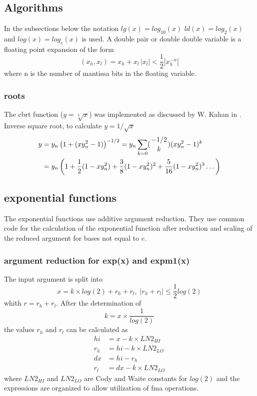 \documentclass[10pt,a4paper,draft]{article}
\numberwithin{equation}{subsection}
\begin{document}
\subsection{Algorithms}
In the subsections below the notation $ lg(x) = log_{10}(x)$
$ ld(x) = log_2(x) $ and $ log(x) = log_e(x) $ is used. A double pair
or double double variable is a floating point expansion of the form
\[
    (x_h, x_l) = x_h + x_l \, |x_l| < \frac{1}{2} |x_h^{-n}|
\]
where n is the number of mantissa bits in the floating variable.
%
%
\subsubsection{roots}
The cbrt function ($ y=\sqrt[3]{x} $) was implemented as discussed by
W. Kahan in \cite{Kahan1991}.\\[10pt]
%
Inverse square root, to calculate $ y = 1/\sqrt{x} $
\begin{equation}
    \begin{aligned}
        y &= y_n \left( 1+ ( x y_n^2 -1) \right)^{-1/2}
            = y_n \sum_{k=0} ({{-1/2}\atop{k}}) (x y_n^2 -1)^k \\
            & = y_n \left( 1 + \frac{1}{2} (1 - x y_n^2 ) +
            \frac{3}{8}(1- x y_n^2)^2 +
            \frac{5}{16} (1-x y_n^2)^3 \dots
            \right)
    \end{aligned}
\end{equation}


\subsection{exponential functions}
\label{sub_sec:expxxx}

The exponential functions use additive argument reduction.
They use common code for the calculation of the exponential function
after reduction and scaling of the reduced argument for bases not
equal to $e$.

\subsubsection{argument reduction for exp(x) and expm1(x)}

    The input argument is split into
    \begin{equation}
        x = k \times log(2) + r_h + r_l, \;
        |r_h +r_l| \le \frac{1}{2} log(2)
    \end{equation}
    whith $r = r_h + r_l$.
    After the determination of
    \[
        k = x \times \frac{1}{log(2)}
    \]
    the values $r_h$ and $r_l$ can be calculated as
    \[
       \begin{aligned}
       hi &= x - k \times LN2_{HI} \\
       r_h &= hi - k \times LN2_{LO} \\
       dx & = hi - r_h \\
       r_l &= dx - k \times LN2_{LO}
       \end{aligned}
    \]
    where $LN2_{HI}$ and $LN2_{LO}$ are Cody and Waite constants for $log(2)$
    and the expressions are organized to allow utilization of fma operations.
\end{document}
